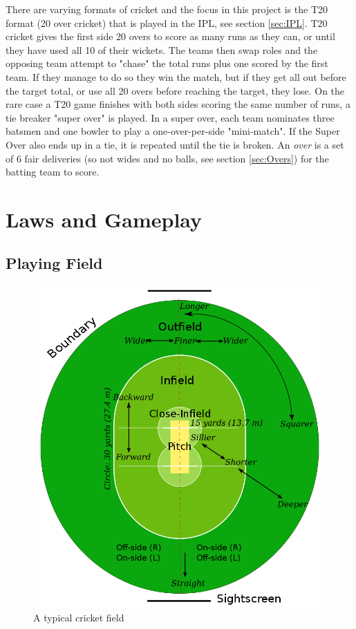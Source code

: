 \documentclass[12pt,a4paper]{report}
\theoremstyle{definition}
\begin{document}
There are varying formats of cricket and the focus in this project is the T20 format (20 over cricket) that is played in the IPL, see section \ref{sec:IPL}. 
T20 cricket gives the first side 20 overs to score as many runs as they can, or until they have used all 10 of their wickets.
The teams then swap roles and the opposing team attempt to "chase" the total runs plus one scored by the first team. 
If they manage to do so they win the match, but if they get all out before the target total, or use all 20 overs before reaching the target, they lose.
On the rare case a T20 game finishes with both sides scoring the same number of runs, a tie breaker "super over" is played.
In a super over, each team nominates three batsmen and one bowler to play a one-over-per-side "mini-match".
If the Super Over also ends up in a tie, it is repeated until the tie is broken.
An \emph{over} is a set of 6 fair deliveries (so not wides and no balls, see section \ref{sec:Overs}) for the batting team to score.

\section{Laws and Gameplay}

\subsection{Playing Field}

\begin{figure}[H]
    \centering
    \includegraphics[width=0.8\linewidth]{Cricket_Field.png}
    \caption{A typical cricket field \citep{cricketWiki}}
    \label{fig:CricketField}
\end{figure}
\end{document}
